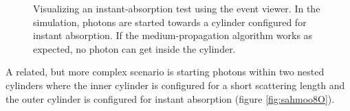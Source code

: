 \begin{figure}[htbp]
  \hfill
  \caption{Visualizing an instant-absorption test using the  event viewer. In the simulation, photons are started towards a cylinder configured for instant absorption. If the medium-propagation algorithm works as expected, no photon can get inside the cylinder.}
  \label{fig:moo9Eiqu}
\end{figure}

A related, but more complex scenario is starting photons within two nested cylinders where the inner cylinder is configured for a short scattering length and the outer cylinder is configured for instant absorption (figure \ref{fig:sahmoo8O}).



